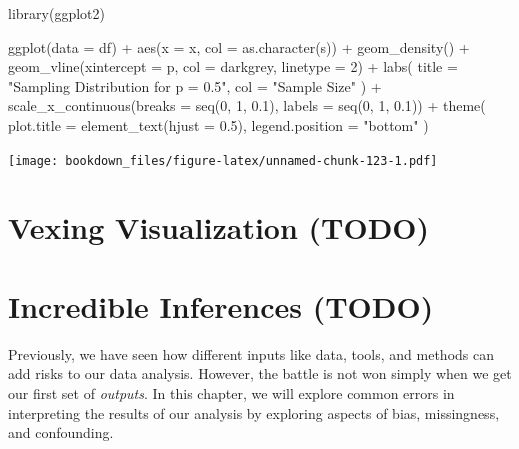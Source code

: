\documentclass[
]{krantz}
\makeatletter
\newenvironment{Shaded}{\begin{snugshade}}{\end{snugshade}}
\newcommand{\AttributeTok}[1]{\textcolor[rgb]{0.61,0.61,0.61}{#1}}
\newcommand{\DecValTok}[1]{\textcolor[rgb]{0.06,0.06,0.06}{#1}}
\newcommand{\FloatTok}[1]{\textcolor[rgb]{0.06,0.06,0.06}{#1}}
\newcommand{\FunctionTok}[1]{\textcolor[rgb]{0,0,0}{#1}}
\newcommand{\NormalTok}[1]{#1}
\newcommand{\SpecialCharTok}[1]{\textcolor[rgb]{0,0,0}{#1}}
\newcommand{\StringTok}[1]{\textcolor[rgb]{0.5,0.5,0.5}{#1}}
\newenvironment{kframe}{%
\medskip{}
\setlength{\fboxsep}{.8em}
 \def\at@end@of@kframe{}%
 \ifinner\ifhmode%
  \def\at@end@of@kframe{\end{minipage}}%
  \begin{minipage}{\columnwidth}%
 \fi\fi%
 \def\FrameCommand##1{\hskip\@totalleftmargin \hskip-\fboxsep
 \colorbox{shadecolor}{##1}\hskip-\fboxsep
     \hskip-\linewidth \hskip-\@totalleftmargin \hskip\columnwidth}%
 \MakeFramed {\advance\hsize-\width
   \@totalleftmargin\z@ \linewidth\hsize
   \@setminipage}}%
 {\par\unskip\endMakeFramed%
 \at@end@of@kframe}
\renewenvironment{Shaded}{\begin{kframe}}{\end{kframe}}
\makeatother
\begin{document}
\begin{Shaded}
\begin{Highlighting}[]
\FunctionTok{library}\NormalTok{(ggplot2)}

\FunctionTok{ggplot}\NormalTok{(}\AttributeTok{data =}\NormalTok{ df) }\SpecialCharTok{+}
  \FunctionTok{aes}\NormalTok{(}\AttributeTok{x =}\NormalTok{ x, }\AttributeTok{col =} \FunctionTok{as.character}\NormalTok{(s)) }\SpecialCharTok{+}
  \FunctionTok{geom\_density}\NormalTok{() }\SpecialCharTok{+}
  \FunctionTok{geom\_vline}\NormalTok{(}\AttributeTok{xintercept =}\NormalTok{ p, }\AttributeTok{col =} \StringTok{\textquotesingle{}darkgrey\textquotesingle{}}\NormalTok{, }\AttributeTok{linetype =} \DecValTok{2}\NormalTok{) }\SpecialCharTok{+}
  \FunctionTok{labs}\NormalTok{(}
    \AttributeTok{title =} \StringTok{"Sampling Distribution for p = 0.5"}\NormalTok{,}
    \AttributeTok{col =} \StringTok{"Sample Size"}
\NormalTok{  ) }\SpecialCharTok{+}
  \FunctionTok{scale\_x\_continuous}\NormalTok{(}\AttributeTok{breaks =} \FunctionTok{seq}\NormalTok{(}\DecValTok{0}\NormalTok{, }\DecValTok{1}\NormalTok{, }\FloatTok{0.1}\NormalTok{), }\AttributeTok{labels =} \FunctionTok{seq}\NormalTok{(}\DecValTok{0}\NormalTok{, }\DecValTok{1}\NormalTok{, }\FloatTok{0.1}\NormalTok{)) }\SpecialCharTok{+}
  \FunctionTok{theme}\NormalTok{(}
    \AttributeTok{plot.title =} \FunctionTok{element\_text}\NormalTok{(}\AttributeTok{hjust =} \FloatTok{0.5}\NormalTok{),}
    \AttributeTok{legend.position =} \StringTok{"bottom"}
\NormalTok{  )}
\end{Highlighting}
\end{Shaded}

\texttt{[image: bookdown\_files/figure-latex/unnamed-chunk-123-1.pdf]}

\hypertarget{vex-viz}{%
\chapter{Vexing Visualization (TODO)}\label{vex-viz}}

\hypertarget{incr-infe}{%
\chapter{Incredible Inferences (TODO)}\label{incr-infe}}

Previously, we have seen how different inputs like data, tools, and methods can add risks to our data analysis. However, the battle is not won simply when we get our first set of \emph{outputs}. In this chapter, we will explore common errors in interpreting the results of our analysis by exploring aspects of bias, missingness, and confounding.
\end{document}
